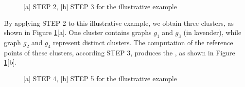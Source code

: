 \begin{figure}[h!]
    \centering
    \qquad
        \caption{[a] STEP 2, [b] STEP 3 for the illustrative example}%
    \label{fig:example3}%
\end{figure}

\noindent
By applying STEP 2 to this illustrative example, we obtain three clusters, as shown in Figure \ref{fig:example3}[a]. One cluster contains graphs $g_1$ and $g_3$ (in lavender), while graph $g_2$ and $g_4$ represent distinct clusters. The computation of the reference points of these clusters, according  STEP 3, produces the , as shown in Figure  \ref{fig:example3}[b].


\begin{figure}[h!]
    \centering
    \qquad
        \caption{[a] STEP 4, [b] STEP 5 for the illustrative example}%
    \label{fig:example4}%
\end{figure}

